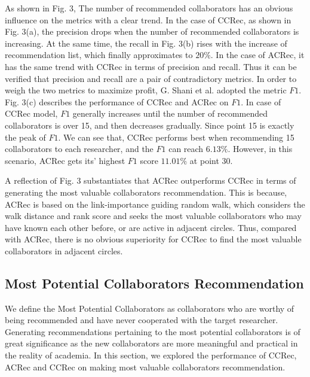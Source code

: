 \documentclass[review]{elsarticle}
\begin{document}
As shown in Fig. 3, The number of recommended collaborators has an obvious influence on the metrics with a clear trend. In the case of CCRec, as shown in Fig. 3(a), the precision drops when the number of recommended collaborators is increasing. At the same time, the recall in Fig. 3(b) rises with the increase of recommendation list, which finally approximates to $20\%$. In the case of ACRec, it has the same trend with CCRec in terms of precision and recall. Thus it can be verified that precision and recall are a pair of contradictory metrics. In order to weigh the two metrics to maximize profit, G. Shani et al. \cite{shani2011evaluating} adopted the metric $F1$. Fig. 3(c) describes the performance of CCRec and ACRec on $F1$. In case of CCRec model, $F1$ generally increases until the number of recommended collaborators is over 15, and then decreases gradually. Since point 15 is exactly the peak of $F1$. We can see that, CCRec performs best when recommending 15 collaborators to each researcher, and the $F1$ can reach $6.13\%$. However, in this scenario, ACRec gets its' highest $F1$ score $11.01\%$ at point 30.

A reflection of Fig. 3 substantiates that ACRec outperforms CCRec in terms of generating the most valuable collaborators recommendation. This is because, ACRec is based on the link-importance guiding random walk, which considers the walk distance and rank score and seeks the most valuable collaborators who may have known each other before, or are active in adjacent circles. Thus, compared with ACRec, there is no obvious superiority for CCRec to find the most valuable collaborators in adjacent circles.

\subsection{Most Potential Collaborators Recommendation}
We define the Most Potential Collaborators as collaborators who are worthy of being recommended and have never cooperated with the target researcher. Generating recommendations pertaining to the most potential collaborators is of great significance as the new collaborators are more meaningful and practical in the reality of academia. In this section, we explored the performance of CCRec, ACRec and CCRec on making most valuable collaborators recommendation.
\end{document}
